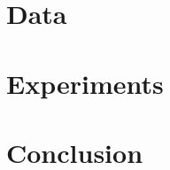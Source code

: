\section{Data}
\label{exp:data}



\section{Experiments}
\label{exp:experiments}

\section{Conclusion}
\label{exp:conclusion}
